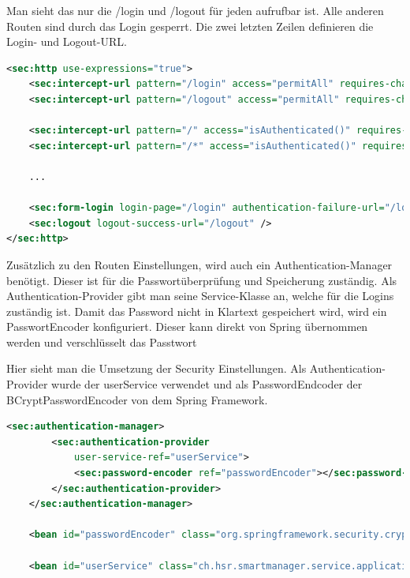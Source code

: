 Man sieht das nur die /login und /logout für jeden aufrufbar ist. Alle anderen Routen sind durch das Login gesperrt. Die zwei letzten Zeilen definieren die Login- und Logout-URL.
\begin{lstlisting}[language=xml]
<sec:http use-expressions="true">
	<sec:intercept-url pattern="/login" access="permitAll" requires-channel="https"/>
	<sec:intercept-url pattern="/logout" access="permitAll" requires-channel="https"/>
	
	<sec:intercept-url pattern="/" access="isAuthenticated()" requires-channel="https" />
	<sec:intercept-url pattern="/*" access="isAuthenticated()" requires-channel="https" />
	
	...
		
	<sec:form-login login-page="/login" authentication-failure-url="/login?error=true" />
	<sec:logout logout-success-url="/logout" />
</sec:http>
\end{lstlisting}

Zusätzlich zu den Routen Einstellungen, wird auch ein Authentication-Manager benötigt. Dieser ist für die Passwortüberprüfung und Speicherung zuständig. Als Authentication-Provider gibt man seine Service-Klasse an, welche für die Logins zuständig ist. Damit das Password nicht in Klartext gespeichert wird, wird ein PasswortEncoder konfiguriert. Dieser kann direkt von Spring übernommen werden und verschlüsselt das Passtwort

Hier sieht man die Umsetzung der Security Einstellungen. Als Authentication-Provider wurde der userService verwendet und als PasswordEndcoder der BCryptPasswordEncoder von dem Spring Framework.
\begin{lstlisting}[language=xml]
<sec:authentication-manager>
		<sec:authentication-provider
			user-service-ref="userService">
			<sec:password-encoder ref="passwordEncoder"></sec:password-encoder>
		</sec:authentication-provider>
	</sec:authentication-manager>
	
	<bean id="passwordEncoder" class="org.springframework.security.crypto.bcrypt.BCryptPasswordEncoder"></bean>
	
	<bean id="userService" class="ch.hsr.smartmanager.service.applicationservices.UserService"></bean>
\end{lstlisting}

